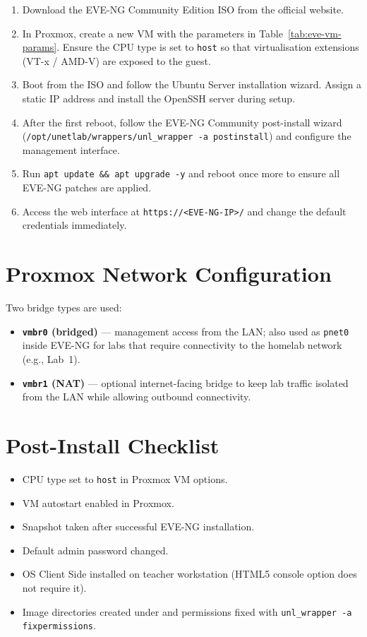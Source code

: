 \begin{enumerate}
    \item Download the EVE-NG Community Edition ISO from the official website.
    \item In Proxmox, create a new VM with the parameters in Table~\ref{tab:eve-vm-params}.
          Ensure the CPU type is set to \texttt{host} so that virtualisation extensions
          (VT-x / AMD-V) are exposed to the guest.
    \item Boot from the ISO and follow the Ubuntu Server installation wizard. Assign
          a static IP address and install the OpenSSH server during setup.
    \item After the first reboot, follow the EVE-NG Community post-install wizard
          (\texttt{/opt/unetlab/wrappers/unl\_wrapper -a postinstall}) and configure
          the management interface.
    \item Run \texttt{apt update \&\& apt upgrade -y} and reboot once more to ensure
          all EVE-NG patches are applied.
    \item Access the web interface at \texttt{https://<EVE-NG-IP>/} and change the
          default credentials immediately.
\end{enumerate}

\section*{Proxmox Network Configuration}

Two bridge types are used:

\begin{itemize}
    \item \textbf{\texttt{vmbr0} (bridged)} --- management access from the LAN; also
          used as \texttt{pnet0} inside EVE-NG for labs that require connectivity to
          the homelab network (e.g., Lab~1).
    \item \textbf{\texttt{vmbr1} (NAT)} --- optional internet-facing bridge to keep
          lab traffic isolated from the LAN while allowing outbound connectivity.
\end{itemize}

\section*{Post-Install Checklist}

\begin{itemize}
    \item[$\square$] CPU type set to \texttt{host} in Proxmox VM options.
    \item[$\square$] VM autostart enabled in Proxmox.
    \item[$\square$] Snapshot taken after successful EVE-NG installation.
    \item[$\square$] Default admin password changed.
    \item[$\square$] OS Client Side installed on teacher workstation (HTML5 console
          option does not require it).
    \item[$\square$] Image directories created under
           and permissions fixed
          with \texttt{unl\_wrapper -a fixpermissions}.
\end{itemize}
